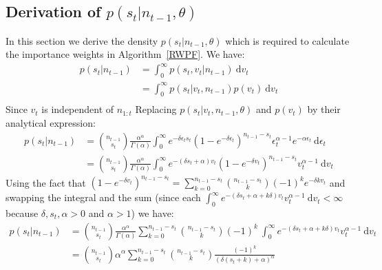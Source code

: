 \documentclass[12pt]{article}
\begin{document}
\begin{appendices}
	\subsection{Derivation of $p(s_t|n_{t-1}, \theta)$} \label{sDensity}
	In this section we derive the density $p(s_t|n_{t-1}, \theta)$ which is required to calculate the importance weights in Algorithm~\ref{RWPF}.
	We have:
	\begin{align*}
	p(s_t | n_{t-1}) & = \int_{0}^{\infty}p(s_t, v_t | n_{t-1})\ \mathrm{d}v_t \\
	& = \int_{0}^{\infty}p(s_t | v_t, n_{t-1})p(v_t)\ \mathrm{d}v_t \\
	\end{align*}
	Since $v_t$ is independent of $n_{1:t}$
	Replacing $p(s_t | v_t, n_{t-1}, \theta)$ and $p(v_t)$ by their analytical expression:
	\begin{align*}
	p(s_t | n_{t-1}) & = \binom{n_{t-1}}{s_t}\frac{\alpha^\alpha}{\Gamma(\alpha)} \int_{0}^{\infty}e^{-\delta\epsilon_t s_t}(1-e^{-\delta\epsilon_t})^{n_{t-1}-s_t}\epsilon_t^{\alpha-1}e^{-\alpha\epsilon_t}\ \mathrm{d}\epsilon_t \\
	& = \binom{n_{t-1}}{s_t}\frac{\alpha^\alpha}{\Gamma(\alpha)}\int_{0}^{\infty}e^{-(\delta s_t+\alpha)v_t }(1-e^{-\delta v_t})^{n_{t-1}-s_t}v_t^{\alpha-1}\ \mathrm{d}v_t
	\end{align*}
	Using the fact that $(1-e^{-\delta v_t})^{n_{t-1}-s_t} = \sum_{k=0}^{n_{t-1}-s_t}\binom{n_{t-1}-s_t}{k}(-1)^ke^{-\delta k v_t}$ and swapping the integral and the sum (since each $\int_{0}^{\infty}e^{-(\delta s_t+\alpha + k\delta)v_t }v_t^{\alpha-1}\ \mathrm{d}v_t < \infty$ because $\delta,  s_t, \alpha > 0$ and $\alpha > 1$) we have:
	\begin{align*}
	p(s_t | n_{t-1}) & = \binom{n_{t-1}}{s_t}\frac{\alpha^\alpha}{\Gamma(\alpha)}\sum_{k=0}^{n_{t-1}-s_t}\binom{n_{t-1}-s_t}{k}(-1)^k \ \int_{0}^{\infty}e^{-(\delta s_t+\alpha + k\delta)v_t }v_t^{\alpha-1}\ \mathrm{d}v_t \\
	& = \binom{n_{t-1}}{s_t}\alpha^\alpha\sum_{k=0}^{n_{t-1}-s_t}\binom{n_{t-1}-s_t}{k}\frac{(-1)^k}{(\delta(s_t+k)+\alpha)^\alpha}
	\end{align*}
\end{appendices}
	
\end{document}
